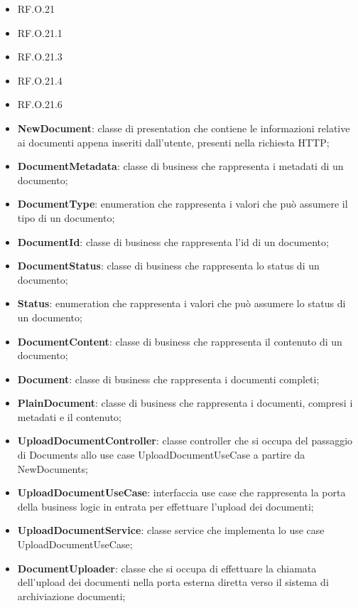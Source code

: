 \documentclass[10pt, a4paper]{article}
\begin{document}
\begin{itemize}
        \item RF.O.21
        \item RF.O.21.1
        \item RF.O.21.3
        \item RF.O.21.4
        \item RF.O.21.6
\end{itemize}

\begin{itemize}

    \item \textbf{NewDocument}: classe di presentation che contiene le informazioni relative ai documenti appena inseriti dall'utente, presenti nella richiesta HTTP;
    \item \textbf{DocumentMetadata}: classe di business che rappresenta i metadati di un documento;
    \item \textbf{DocumentType}: enumeration che rappresenta i valori che può assumere il tipo di un documento;
    \item \textbf{DocumentId}: classe di business che rappresenta l'id di un documento;
    \item \textbf{DocumentStatus}: classe di business che rappresenta lo status di un documento;
    \item \textbf{Status}: enumeration che rappresenta i valori che può assumere lo status di un documento;
    \item \textbf{DocumentContent}: classe di business che rappresenta il contenuto di un documento;
    \item \textbf{Document}: classe di business che rappresenta i documenti completi;
    \item \textbf{PlainDocument}: classe di business che rappresenta i documenti, compresi i metadati e il contenuto;
    \item \textbf{UploadDocumentController}: classe controller che si occupa del passaggio di Documents allo use case UploadDocumentUseCase a partire da NewDocuments;
    \item \textbf{UploadDocumentUseCase}: interfaccia use case che rappresenta la porta della business logic in entrata per effettuare l'upload dei documenti;
    \item \textbf{UploadDocumentService}: classe service che implementa lo use case UploadDocumentUseCase;
    \item \textbf{DocumentUploader}: classe che si occupa di effettuare la chiamata dell'upload dei documenti nella porta esterna diretta verso il sistema di archiviazione documenti;

\end{itemize}
\end{document}
